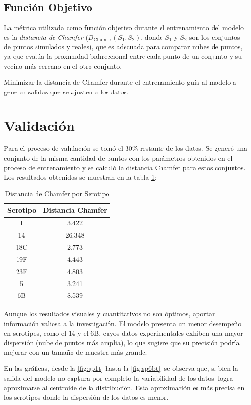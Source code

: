 \subsection{Función Objetivo}

La métrica utilizada como función objetivo durante el entrenamiento del modelo es la \textit{distancia de Chamfer} ($D_{\mathrm{Chamfer}}(S_1, S_2)$, donde \( S_1 \) y \( S_2 \) son los conjuntos de puntos simulados y reales), que es adecuada para comparar nubes de puntos, ya que evalúa la proximidad bidireccional entre cada punto de un conjunto y su vecino más cercano en el otro conjunto.

Minimizar la distancia de Chamfer durante el entrenamiento guía al modelo a generar salidas que se ajusten a los datos.


\section{Validación}
Para el proceso de validación se tomó el 30\% restante de los datos. Se generó una conjunto de la misma cantidad de puntos con los parámetros obtenidos en el proceso de entrenamiento y se calculó la distancia Chamfer para estos conjuntos. Los resultados obtenidos se muestran en la tabla \ref{tab:chamfer_serotipos}:

\begin{table}[h]
\centering
\caption{Distancia de Chamfer por Serotipo}
\begin{tabular}{|c|c|}
\hline
\textbf{Serotipo} & \textbf{Distancia Chamfer} \\
\hline
1   & 3.422  \\
14  & 26.348 \\
18C & 2.773  \\
19F & 4.443  \\
23F & 4.803  \\
5   & 3.241  \\
6B  & 8.539  \\
\hline
\end{tabular}
\label{tab:chamfer_serotipos}
\end{table}
Aunque los resultados visuales y cuantitativos no son óptimos, aportan información valiosa a la investigación. El modelo presenta un menor desempeño en serotipos, como el 14 y el 6B, cuyos datos experimentales exhiben una mayor dispersión (nube de puntos más amplia), lo que sugiere que su precisión podría mejorar con un tamaño de muestra más grande.

En las gráficas, desde la \ref{fig:sp1t} hasta la \ref{fig:sp6bt}, se observa que, si bien la salida del modelo no captura por completo la variabilidad de los datos, logra aproximarse al centroide de la distribución. Esta aproximación es más precisa en los serotipos donde la dispersión de los datos es menor.

